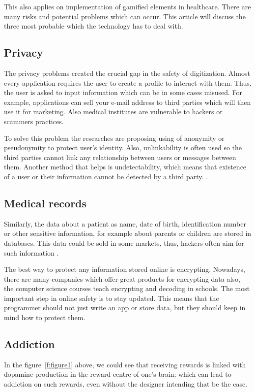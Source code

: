\documentclass[10pt,twoside,english,a4paper]{article}
\begin{document}
This also applies on implementation of gamified elements in healthcare. There are many risks and potential problems which can occur. This article will discuss the  three most probable which the technology has to deal with.

\subsection{Privacy}\label{privacy}
The privacy problems created the crucial gap in the safety of digitization. Almost every application requires  the user to create a profile to interact with them. Thus, the user is asked to input information which can be in some cases misused. For example, applications can sell your e-mail address to third parties which will then use it for marketing. Also medical institutes are vulnerable to hackers or scammers practices.

To solve this problem the researches are proposing using of anonymity or pseudonymity to protect user's identity. Also, unlinkability is often used so the third parties cannot link any relationship between users or messages between them. Another method that helps is undetectability, which means that existence of a user or their information cannot be detected by a third party. \cite{fi11030067}. 

\subsection{Medical records} \label{records}
Similarly, the data about a patient as name, date of birth, identification number or other sensitive information, for example about parents or children are stored in databases. This data could be sold in some markets, thus, hackers often aim for such information \cite{fi11030067}. 

The best way to protect any information stored online is encrypting. Nowadays, there are many companies which offer great products for encrypting data also, the computer science courses teach encrypting and decoding in schools. The most important step in online safety is to stay updated. This means that the programmer should not just write an app or store data, but they should keep in mind how to protect them.

\subsection{Addiction} \label {addiction}
In the figure~\ref{f:figure1} above, we could see that receiving rewards is linked with dopamine production in the reward centre of one's brain; which can lead to addiction on such rewards, even without the designer intending that be the case.
\end{document}
